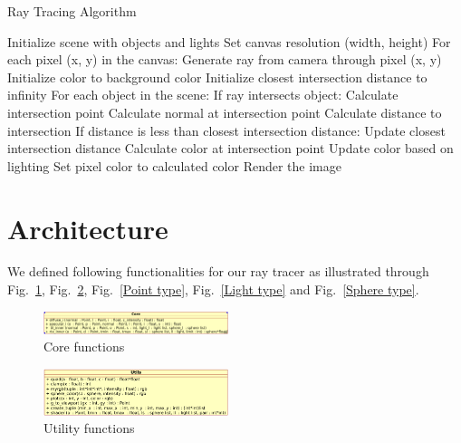 \documentclass[conference]{IEEEtran}
\begin{document}
\begin{algorithm}
  \caption{Ray Tracing Algorithm}
  \begin{algorithmic}[1]
      \STATE Initialize scene with objects and lights
      \STATE Set canvas resolution (width, height)
      \STATE For each pixel (x, y) in the canvas:
          \STATE \quad Generate ray from camera through pixel (x, y)
          \STATE \quad Initialize color to background color
          \STATE \quad Initialize closest intersection distance to infinity
          \STATE \quad For each object in the scene:
              \STATE \quad \quad If ray intersects object:
                  \STATE \quad \quad \quad Calculate intersection point
                  \STATE \quad \quad \quad Calculate normal at intersection point
                  \STATE \quad \quad \quad Calculate distance to intersection
                  \STATE \quad \quad \quad If distance is less than closest intersection distance:
                      \STATE \quad \quad \quad \quad Update closest intersection distance
                      \STATE \quad \quad \quad \quad Calculate color at intersection point
                      \STATE \quad \quad \quad \quad Update color based on lighting
          \STATE \quad Set pixel color to calculated color
      \STATE Render the image
  \end{algorithmic}
\end{algorithm}

\section{Architecture}
We defined following functionalities for our ray tracer as illustrated through Fig.~\ref{Core functions}, Fig.~\ref{Utility functions}, Fig.~\ref{Point type}, Fig.~\ref{Light type} and Fig.~\ref{Sphere type}.

\begin{figure}[htbp]
  \centerline{\includegraphics[width=0.48\textwidth]{./figs/corediagram.png}}
  \caption{Core functions}
  \label{Core functions}
\end{figure}

\begin{figure}[htbp]
  \centerline{\includegraphics[width=0.48\textwidth]{./figs/utilsdiagram.png}}
  \caption{Utility functions}
  \label{Utility functions}
\end{figure}
\end{document}
